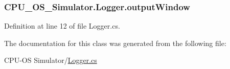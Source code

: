 \subsubsection[{output\+Window}]{ C\+P\+U\+\_\+\+O\+S\+\_\+\+Simulator.\+Logger.\+output\+Window\hspace{0.3cm}{\ttfamily [private]}}\label{class_c_p_u___o_s___simulator_1_1_logger_acbd4acecaad3094385f8527483e0a9ab}


Definition at line 12 of file Logger.\+cs.



The documentation for this class was generated from the following file\+:\begin{DoxyCompactItemize}
\item 
C\+P\+U-\/\+O\+S Simulator/\hyperlink{_logger_8cs}{Logger.\+cs}\end{DoxyCompactItemize}
